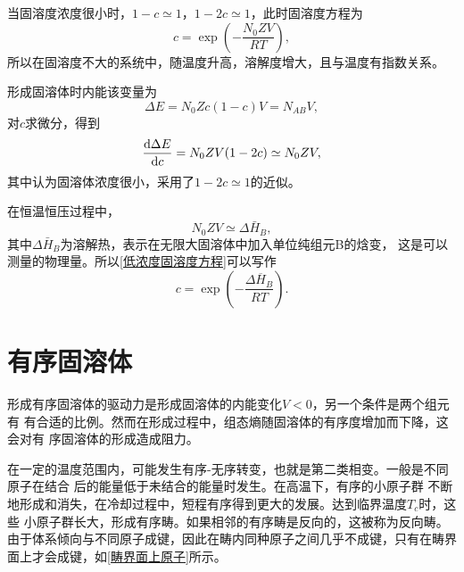             当固溶度浓度很小时，$1-c\simeq 1$，$1-2c\simeq 1$，此时固溶度方程为
            \begin{equation}
                c=\exp \left(-\frac{N_{0} Z V}{R T}\right)\label{低浓度固溶度方程},
            \end{equation}
            所以在固溶度不大的系统中，随温度升高，溶解度增大，且与温度有指数关系。

            形成固溶体时内能该变量为
            \begin{equation}
                \Delta E=N_0Zc(1-c)V=N_{AB}V,
            \end{equation}
            对$c$求微分，得到
            \begin{equation}
                \frac{\mathop{}\!\mathrm{d} \Delta E}{\mathop{}\!\mathrm{d} c}=N_0ZV(1-2c)\simeq N_0ZV,
            \end{equation}
            其中认为固溶体浓度很小，采用了$1-2c\simeq 1$的近似。

            在恒温恒压过程中，
            \begin{equation}
                N_0ZV\simeq \Delta\bar{H}_B,
            \end{equation}
            其中$\Delta\bar{H}_B$为溶解热，表示在无限大固溶体中加入单位纯组元B的焓变，
            这是可以测量的物理量。所以\autoref{低浓度固溶度方程}可以写作
            \begin{equation}
                c=\exp \left(-\frac{\Delta \overline{H}_{B}}{R T}\right).
            \end{equation}

    \section{有序固溶体}
        形成有序固溶体的驱动力是形成固溶体的内能变化$V<0$，另一个条件是两个组元有
        有合适的比例。然而在形成过程中，组态熵随固溶体的有序度增加而下降，这会对有
        序固溶体的形成造成阻力。

        在一定的温度范围内，可能发生有序-无序转变，也就是第二类相变。一般是不同原子在结合
        后的能量低于未结合的能量时发生。在高温下，有序的小原子群
        不断地形成和消失，在冷却过程中，短程有序得到更大的发展。达到临界温度$T_c$时，这些
        小原子群长大，形成有序畴。如果相邻的有序畴是反向的，这被称为反向畴。
        由于体系倾向与不同原子成键，因此在畴内同种原子之间几乎不成键，只有在畴界面上才会成键，如\autoref{畴界面上原子}所示。

